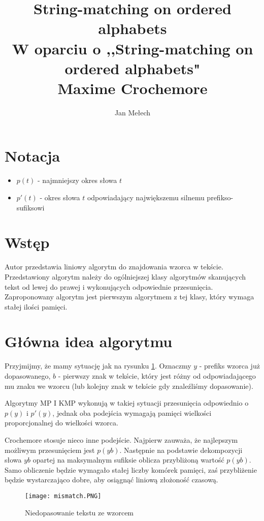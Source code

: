 \documentclass[a4paper,11pt]{article}
\title{String-matching on ordered alphabets \\ \large W oparciu o ,,String-matching on ordered alphabets"\\ Maxime Crochemore}
\author{Jan Mełech}
\date{}
\theoremstyle{definition}
\begin{document}
\maketitle

\section{Notacja}
\begin{itemize}
    \item $p(t)$ - najmniejszy okres słowa $t$
    \item $p'(t)$ - okres słowa $t$ odpowiadający największemu silnemu prefikso-sufiksowi
\end{itemize}

\section{Wstęp}

Autor przedstawia liniowy algorytm do znajdowania wzorca w tekście. Przedstawiony algorytm należy do ogólniejszej klasy algorytmów skanujących tekst od lewej do prawej i wykonujących odpowiednie przesunięcia. Zaproponowany algorytm jest pierwszym algorytmem z tej klasy, który wymaga stałej ilości pamięci.


\section{Główna idea algorytmu}

Przyjmijmy, że mamy sytuację jak na rysunku \ref{fig:mismatch}. Oznaczmy $y$ - prefiks wzorca już dopasowanego, $b$ - pierwszy znak w tekście, który jest różny od odpowiadającego mu znaku we wzorcu (lub kolejny znak w tekście gdy znaleźliśmy dopasowanie).
\par 
Algorytmy MP I KMP wykonują w takiej sytuacji przesunięcia odpowiednio o $p(y)$ i $p'(y)$, jednak oba podejścia wymagają pamięci wielkości proporcjonalnej do wielkości wzorca. 
\par 
Crochemore stosuje nieco inne podejście. Najpierw zauważa, że najlepszym możliwym przesunięciem jest $p(yb)$. Następnie na podstawie dekompozycji słowa $yb$ opartej na maksymalnym sufiksie oblicza przybliżoną wartość  $p(yb)$. Samo obliczenie będzie wymagało stałej liczby komórek pamięci, zaś przybliżenie będzie wystarczająco dobre, aby osiągnąć liniową złożoność czasową.

\begin{figure}
    \centering
    \texttt{[image: mismatch.PNG]} \\
    \caption{Niedopasowanie tekstu ze wzorcem}
    \label{fig:mismatch}
\end{figure}
\end{document}
